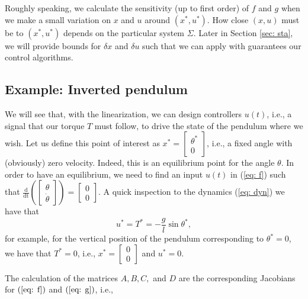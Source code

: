 \documentclass[11pt,a4paper,titlepage]{article}
\begin{document}
Roughly speaking, we calculate the sensitivity (up to first order) of $f$ and $g$ when we make a small variation on $x$ and $u$ around $(x^*,u^*)$. How close $(x,u)$ must be to $(x^*,u^*)$ depends on the particular system $\Sigma$. Later in Section \ref{sec: sta}, we will provide bounds for $\delta x$ and $\delta u$ such that we can apply with guarantees our control algorithms.

\subsection{Example: Inverted pendulum}
We will see that, with the linearization, we can design controllers $u(t)$, i.e., a signal that our torque $T$ must follow, to drive the state of the pendulum where we wish. Let us define this point of interest as $x^* = \begin{bmatrix}\theta^* \\ 0\end{bmatrix}$, i.e., a fixed angle with (obviously) zero velocity. Indeed, this is an equilibrium point for the angle $\theta$. In order to have an equilibrium, we need to find an input $u(t)$ in (\ref{eq: f}) such that $\frac{\mathrm{d}}{\mathrm{dt}}\left(\begin{bmatrix}\theta \\ \dot\theta \end{bmatrix}\right) = \begin{bmatrix}0 \\ 0 \end{bmatrix}$. A quick inspection to the dynamics (\ref{eq: dyn}) we have that
\begin{equation}
	u^* = T^* = -\frac{g}{l}\sin\theta^*,
\end{equation}
for example, for the vertical position of the pendulum corresponding to $\theta^* = 0$, we have that $T^*=0$, i.e., $x^* = \begin{bmatrix}0\\0\end{bmatrix}$ and $u^* = 0$.

The calculation of the matrices $A,B,C,$ and $D$ are the corresponding Jacobians for $(\ref{eq: f})$ and $(\ref{eq: g})$, i.e.,
\end{document}
